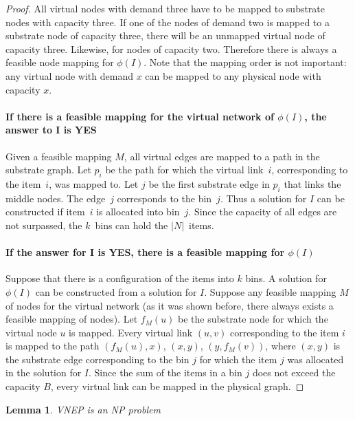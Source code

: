 \documentclass[conference]{IEEEtran}
\newtheorem{lemma}{Lemma}[section]
\begin{document}
\begin{proof}
All virtual nodes with demand three have to be mapped to substrate nodes with capacity three.
If one of the nodes of demand two is mapped to a substrate node of capacity three, there will be an unmapped virtual node of capacity three. 
Likewise, for nodes of capacity two.
Therefore there is always a feasible node mapping for $\phi(I)$. 
Note that the mapping order is not important: any virtual node with demand $x$ can be mapped to any physical node with capacity $x$.

\paragraph{If there is a feasible mapping for the virtual network of $\phi(I)$, the answer to I is YES}
Given a feasible mapping $M$, all virtual edges are mapped to a path in the substrate graph. 
Let $p_{i}$ be the path for which the virtual link~$i$, corresponding to the item~$i$, was mapped to. 
Let $j$ be the first substrate edge in $p_{i}$ that links the middle nodes. The edge~$j$ corresponds to the bin~$j$. Thus a solution for $I$ can be constructed if item~$i$ is allocated into bin~$j$. 
Since the capacity of all edges are not surpassed, the $k$~bins can hold the $|N|$~items.

\paragraph{If the answer for I is YES, there is a feasible mapping for $\phi(I)$}
Suppose that there is a configuration of the items into $k$ bins.
A solution for $\phi(I)$ can be constructed from a solution for $I$.
Suppose any feasible mapping $M$ of nodes for the virtual network (as it was shown before, there always exists a feasible mapping of nodes).
Let $f_{M}(u)$ be the substrate node for which the virtual node $u$ is mapped. 
Every virtual link $(u,v)$ corresponding to the item $i$ is mapped to the path $(f_{M}(u), x)$, $(x,y)$, $(y,f_{M}(v))$, where $(x,y)$ is the substrate edge corresponding to the bin $j$ for which the item $j$ was allocated in the solution for $I$.
Since the sum of the items in a bin $j$ does not exceed the capacity $B$, every virtual link can be mapped in the physical graph.
\end{proof}

\begin{lemma} \label{lem:cert}
  VNEP is an NP problem
\end{lemma}
\end{document}
